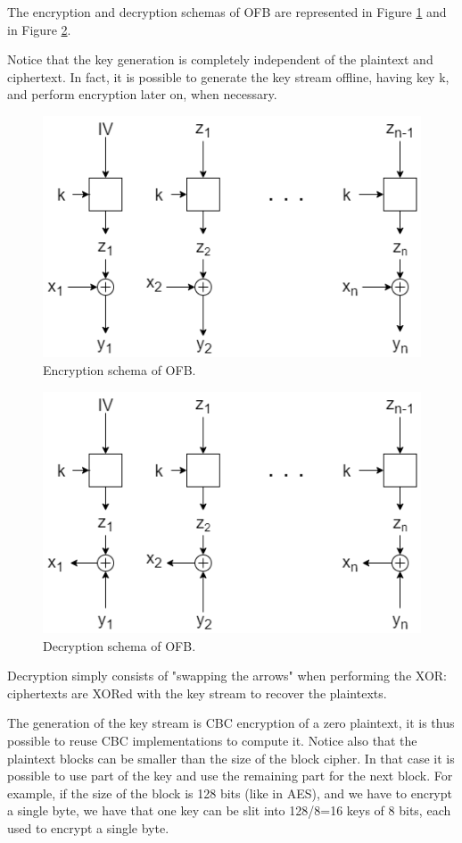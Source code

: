 \documentclass[a4paper, 12pt]{report}
\begin{document}
The encryption and decryption schemas of OFB are represented in Figure \ref{fig:encOFB} and in Figure \ref{fig:decOFB}.

Notice that the key generation is completely independent of the plaintext and ciphertext. In fact, it is possible to generate the key stream offline, having key k, and perform encryption later on, when necessary.
\begin{figure}[H]
	\centering
	\includegraphics[scale=0.55]{images/Lec9/encOFB.png}
	\caption{Encryption schema of OFB.}
	\label{fig:encOFB}
\end{figure}

\begin{figure}[H]
	\centering
	\includegraphics[scale=0.55]{images/Lec9/decOFB.png}
	\caption{Decryption schema of OFB.}
	\label{fig:decOFB}
\end{figure}

Decryption simply consists of "swapping the arrows" when performing the XOR: ciphertexts are XORed with the key stream to recover the plaintexts.

The generation of the key stream is CBC encryption of a zero plaintext, it is thus possible to reuse CBC implementations to compute it. Notice also that the plaintext blocks can be smaller than the size of the block cipher. In that case it is possible to use part of the key and use the remaining part for the next block. For example, if the size of the block is 128 bits (like in AES), and we have to encrypt a single byte, we have that one key can be slit into 128/8=16 keys of 8 bits, each used to encrypt a single byte.
\end{document}
